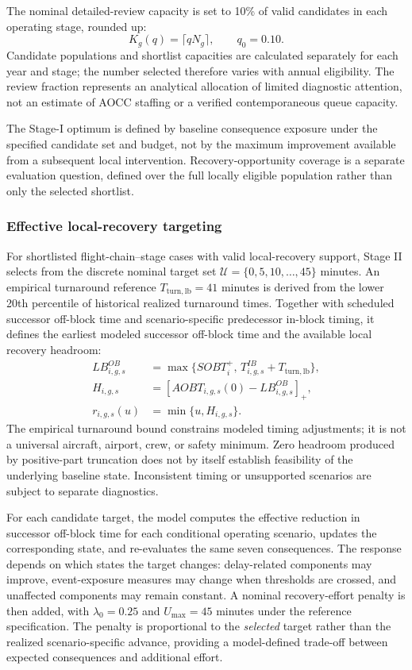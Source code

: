 The nominal detailed-review capacity is set to 10\% of valid candidates in each operating stage, rounded up:
\[
K_g(q)=\lceil qN_g\rceil,\qquad q_0=0.10.
\]
Candidate populations and shortlist capacities are calculated separately for each year and stage; the number selected therefore varies with annual eligibility. The review fraction represents an analytical allocation of limited diagnostic attention, not an estimate of AOCC staffing or a verified contemporaneous queue capacity.

The Stage-I optimum is defined by baseline consequence exposure under the specified candidate set and budget, not by the maximum improvement available from a subsequent local intervention. Recovery-opportunity coverage is a separate evaluation question, defined over the full locally eligible population rather than only the selected shortlist.

\subsubsection{Effective local-recovery targeting}

For shortlisted flight-chain--stage cases with valid local-recovery support, Stage II selects from the discrete nominal target set $\mathcal U=\{0,5,10,\ldots,45\}$ minutes. An empirical turnaround reference $T_{\mathrm{turn,lb}}=41$ minutes is derived from the lower 20th percentile of historical realized turnaround times. Together with scheduled successor off-block time and scenario-specific predecessor in-block timing, it defines the earliest modeled successor off-block time and the available local recovery headroom:
\[
\begin{aligned}
LB^{OB}_{i,g,s}&=\max\{SOBT_i^+,\,T^{IB}_{i,g,s}+T_{\mathrm{turn,lb}}\},\\
H_{i,g,s}&=[AOBT_{i,g,s}(0)-LB^{OB}_{i,g,s}]_+,\\
r_{i,g,s}(u)&=\min\{u,H_{i,g,s}\}.
\end{aligned}
\]
The empirical turnaround bound constrains modeled timing adjustments; it is not a universal aircraft, airport, crew, or safety minimum. Zero headroom produced by positive-part truncation does not by itself establish feasibility of the underlying baseline state. Inconsistent timing or unsupported scenarios are subject to separate diagnostics.

For each candidate target, the model computes the effective reduction in successor off-block time for each conditional operating scenario, updates the corresponding state, and re-evaluates the same seven consequences. The response depends on which states the target changes: delay-related components may improve, event-exposure measures may change when thresholds are crossed, and unaffected components may remain constant. A nominal recovery-effort penalty is then added, with $\lambda_0=0.25$ and $U_{\max}=45$ minutes under the reference specification. The penalty is proportional to the \emph{selected} target rather than the realized scenario-specific advance, providing a model-defined trade-off between expected consequences and additional effort.

